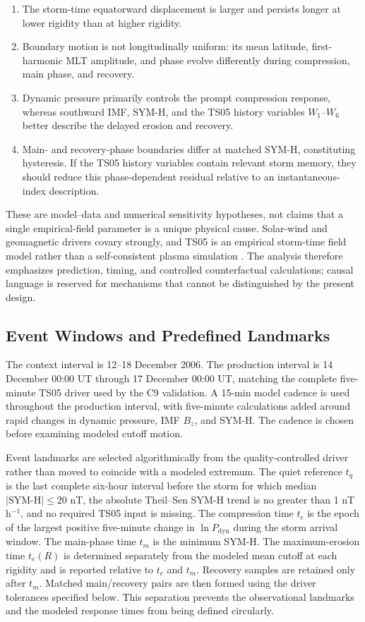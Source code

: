 \begin{enumerate}
\item The storm-time equatorward displacement is larger and persists longer at
lower rigidity than at higher rigidity.
\item Boundary motion is not longitudinally uniform: its mean latitude,
first-harmonic MLT amplitude, and phase evolve differently during compression,
main phase, and recovery.
\item Dynamic pressure primarily controls the prompt compression response,
whereas southward IMF, SYM-H, and the TS05 history variables $W_1$--$W_6$
better describe the delayed erosion and recovery.
\item Main- and recovery-phase boundaries differ at matched SYM-H, constituting
hysteresis. If the TS05 history variables contain relevant storm memory, they
should reduce this phase-dependent residual relative to an instantaneous-index
description.
\end{enumerate}

These are model--data and numerical sensitivity hypotheses, not claims that a
single empirical-field parameter is a unique physical cause. Solar-wind and
geomagnetic drivers covary strongly, and TS05 is an empirical storm-time field
model rather than a self-consistent plasma simulation \cite{Tsyganenko-2005-JGR}.
The analysis therefore emphasizes prediction, timing, and controlled
counterfactual calculations; causal language is reserved for mechanisms that
cannot be distinguished by the present design.

\subsection{Event Windows and Predefined Landmarks}

The context interval is 12--18 December 2006. The production interval is
14 December 00:00 UT through 17 December 00:00 UT, matching the complete
five-minute TS05 driver used by the C9 validation. A 15-min model cadence is
used throughout the production interval, with five-minute calculations added
around rapid changes in dynamic pressure, IMF $B_z$, and SYM-H. The cadence is
chosen before examining modeled cutoff motion.

Event landmarks are selected algorithmically from the quality-controlled
driver rather than moved to coincide with a modeled extremum. The quiet
reference $t_q$ is the last complete six-hour interval before the storm for
which median $|\mathrm{SYM\mbox{-}H}|\leq20$ nT, the absolute Theil--Sen SYM-H
trend is no greater than 1 nT h$^{-1}$, and no required TS05 input is missing.
The compression time $t_c$ is the epoch of the largest positive five-minute
change in $\ln P_{\mathrm{dyn}}$ during the storm arrival window. The
main-phase time $t_m$ is the
minimum SYM-H. The maximum-erosion time $t_e(R)$ is determined separately from
the modeled mean cutoff at each rigidity and is reported relative to $t_c$ and
$t_m$. Recovery samples are retained only after $t_m$. Matched main/recovery
pairs are then formed using the driver tolerances specified below. This
separation prevents the observational landmarks and the modeled response times
from being defined circularly.

